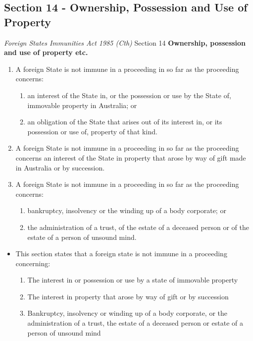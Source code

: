\subsection{Section 14 - Ownership, Possession and Use of Property}
\begin{statutedetails}{\textit{Foreign States Immunities Act 1985 (Cth)} Section 14}
    \flushleft
    \textbf{Ownership, possession and use of property etc.}
    \begin{enumerate}
        \item A foreign State is not immune in a proceeding in so far as the proceeding concerns:
        \begin{enumerate}
            \item an interest of the State in, or the possession or use by the State of, immovable property in Australia; or
            \item an obligation of the State that arises out of its interest in, or its possession or use of, property of that kind.
        \end{enumerate}
        \item A foreign State is not immune in a proceeding in so far as the proceeding concerns an interest of the State in property that arose by way of gift made in Australia or by succession.
        \item A foreign State is not immune in a proceeding in so far as the proceeding concerns:
        \begin{enumerate}
            \item bankruptcy, insolvency or the winding up of a body corporate; or
            \item the administration of a trust, of the estate of a deceased person or of the estate of a person of unsound mind.
        \end{enumerate}
    \end{enumerate}
\end{statutedetails}

\begin{itemize}
    \item This section states that a foreign state is not immune in a proceeding concerning:
    \begin{enumerate}
        \item The interest in or possession or use by a state of immovable property
        \item The interest in property that arose by way of gift or by succession
        \item Bankruptcy, insolvency or winding up of a body corporate, or the administration of a trust, the estate of a deceased person or estate of a person of unsound mind
    \end{enumerate}
\end{itemize}

